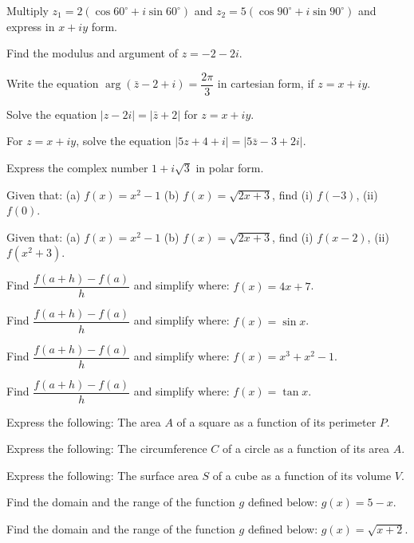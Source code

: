 \documentclass[11pt,a4paper]{article}
\begin{document}
\begin{shortlist}
\item Multiply $z_1=2(\cos 60^\circ+i\sin 60^\circ)$ and $z_2=5(\cos 90^\circ+i\sin 90^\circ)$ and express in $x+iy$ form.

\item Find the modulus and argument of $z=-2-2i$.

\item Write the equation $\arg(\bar{z}-2+i)=\dfrac{2\pi}{3}$ in cartesian form, if $z=x+iy$.

\item Solve the equation $|z-2i|=|\bar{z}+2|$ for $z=x+iy$.

\item For $z=x+iy$, solve the equation $|5z+4+i|=|5\bar{z}-3+2i|$.

\item Express the complex number $1+i\sqrt{3}$ in polar form.

\item Given that: (a) $f(x)=x^2-1$ (b) $f(x)=\sqrt{2x+3}$, find (i) $f(-3)$, (ii) $f(0)$.

\item Given that: (a) $f(x)=x^2-1$ (b) $f(x)=\sqrt{2x+3}$, find (i) $f(x-2)$, (ii) $f(x^2+3)$.

\item Find $\dfrac{f(a+h)-f(a)}{h}$ and simplify where: $f(x)=4x+7$.

\item Find $\dfrac{f(a+h)-f(a)}{h}$ and simplify where: $f(x)=\sin x$.

\item Find $\dfrac{f(a+h)-f(a)}{h}$ and simplify where: $f(x)=x^3+x^2-1$.

\item Find $\dfrac{f(a+h)-f(a)}{h}$ and simplify where: $f(x)=\tan x$.

\item Express the following: The area $A$ of a square as a function of its perimeter $P$.

\item Express the following: The circumference $C$ of a circle as a function of its area $A$.

\item Express the following: The surface area $S$ of a cube as a function of its volume $V$.

\item Find the domain and the range of the function $g$ defined below: $g(x)=5-x$.

\item Find the domain and the range of the function $g$ defined below: $g(x)=\sqrt{x+2}$.


\end{shortlist}
\end{document}
